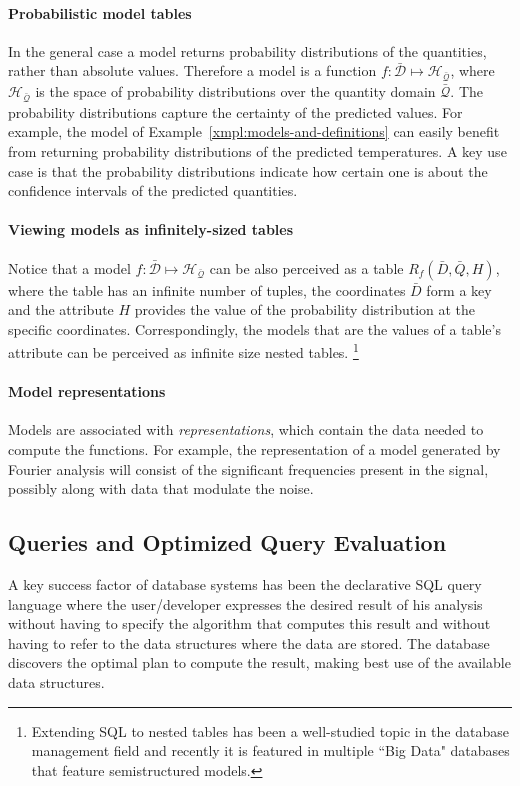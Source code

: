 \paragraph{Probabilistic model tables} In the general case a model returns probability distributions of the quantities, rather than absolute values. Therefore a model is a function $f:\mathcal{\bar{D}}\mapsto \mathcal{H_{\bar{Q}}}$, where $\mathcal{H_{\bar{Q}}}$ is the space of probability distributions over the quantity domain $\mathcal{\bar{Q}}$. The probability distributions capture the certainty of the predicted values.  For example, the model of Example~\ref{xmpl:models-and-definitions} can easily benefit from returning probability distributions of the predicted temperatures. A key use case is that the probability distributions indicate how certain one is about the confidence intervals of the predicted quantities.

\paragraph{Viewing models as infinitely-sized tables} Notice that a model $f:\mathcal{\bar{D}}\mapsto \mathcal{H_{\bar{Q}}}$ can be also perceived as a table $R_f(\bar{D}, \bar{Q}, H)$, where the table has an infinite number of tuples, the coordinates $\bar{D}$ form a key and the attribute $H$ provides the value of the probability distribution at the specific coordinates.
Correspondingly, the models that are the values of a table's attribute can be perceived as infinite size nested tables.%
\footnote{Extending SQL to nested tables has been a well-studied topic in the database management field and recently it is featured in multiple ``Big Data" databases that feature semistructured models. 
}

\paragraph{Model representations} 
Models are associated with {\em representations}, which contain the data needed to compute the functions. For example, the representation of a model generated by Fourier analysis will consist of the significant frequencies present in the signal, possibly along with data that modulate the noise. 

\subsection{Queries and Optimized Query Evaluation}
\label{sec:queries}
A key success factor of database systems has been the declarative SQL query language where the user/developer expresses the desired result of his analysis without having to specify the algorithm that computes this result and without having to refer to the data structures where the data are stored. The database discovers the optimal plan to compute the result, making best use of the available data structures. 

